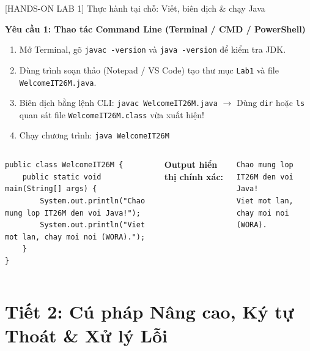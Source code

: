 \documentclass[aspectratio=169, 10pt]{beamer}
\begin{document}
\begin{frame}[fragile]{[HANDS-ON LAB 1] Thực hành tại chỗ: Viết, biên dịch \& chạy Java}
  \begin{tcolorbox}[colback=white,colframe=UniGreen,title=\textbf{Nhiệm vụ thực hành Tiết 1 (Thời gian: 15 phút -- Tất cả sinh viên thực hiện)}]
    \small
    \textbf{Yêu cầu 1: Thao tác Command Line (Terminal / CMD / PowerShell)}
    \begin{enumerate}\footnotesize
      \item Mở Terminal, gõ \texttt{javac -version} và \texttt{java -version} để kiểm tra JDK.
      \item Dùng trình soạn thảo (Notepad / VS Code) tạo thư mục \texttt{Lab1} và file \texttt{WelcomeIT26M.java}.
      \item Biên dịch bằng lệnh CLI: \texttt{javac WelcomeIT26M.java} $\to$ Dùng \texttt{dir} hoặc \texttt{ls} quan sát file \texttt{WelcomeIT26M.class} vừa xuất hiện!
      \item Chạy chương trình: \texttt{java WelcomeIT26M}
    \end{enumerate}
  \end{tcolorbox}

  \begin{columns}
    \begin{lstlisting}[caption={Mã nguồn WelcomeIT26M.java}]
public class WelcomeIT26M {
    public static void main(String[] args) {
        System.out.println("Chao mung lop IT26M den voi Java!");
        System.out.println("Viet mot lan, chay moi noi (WORA).");
    }
}
    \end{lstlisting}

    \textbf{Output hiển thị chính xác:}
    \begin{lstlisting}[style=terminalStyle]
Chao mung lop IT26M den voi Java!
Viet mot lan, chay moi noi (WORA).
    \end{lstlisting}
  \end{columns}
\end{frame}

\section{Tiết 2: Cú pháp Nâng cao, Ký tự Thoát \& Xử lý Lỗi}
\end{document}
